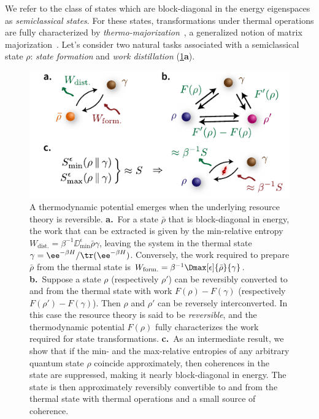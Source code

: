 \documentclass[prl,reprint,longbibliography,superscriptaddress]{revtex4-1}
\renewcommand{\Dminz}[1][]{\DD_{\mathrm{min}}^{#1}}
\begin{document}
We refer to the class of states which are block-diagonal in the energy
eigenspaces as \emph{semiclassical states}.  For these states, transformations
under thermal operations are fully characterized by
\emph{thermo-majorization}~\cite{Horodecki2013_ThermoMaj}, a generalized notion
of matrix majorization~\cite{Ruch1978JCP,BookBhatiaMatrixAnalysis1997,%
  BookMarshall2010Inequalities}.
Let's consider two natural tasks associated with a semiclassical state $\rho$:
\emph{state formation} and \emph{work distillation}
(\cref{fig:ReversibleInterConversionStates}\textbf{a}).
\begin{figure}
  \centering
  \includegraphics{fig/ReversibleInterConversionStates}
  \caption{A thermodynamic potential emerges when the underlying resource theory
    is reversible.  \textbf{a.}~For a state $\bar\rho$ that is block-diagonal in
    energy, the work that can be extracted is given by the min-relative entropy
    $W_{\mathrm{dist.}} = \beta^{-1}\Dminz[\epsilon]{\bar\rho}{\gamma}$, leaving
    the system in the thermal state $\gamma=\ee^{-\beta H}/\tr(\ee^{-\beta H})$.
    Conversely, the work required to prepare $\bar\rho$ from the thermal state
    is $W_{\mathrm{form.}} = \beta^{-1}\Dmax[\epsilon]{\bar\rho}{\gamma}$.
    \textbf{b.}~Suppose a state $\rho$ (respectively $\rho'$) can be reversibly
    converted to and from the thermal state with work $F(\rho)-F(\gamma)$
    (respectively $F(\rho')-F(\gamma)$).  Then $\rho$ and $\rho'$ can be
    reversely interconverted.  In this case the resource theory is said to be
    \emph{reversible}, and the thermodynamic potential $F(\rho)$ fully
    characterizes the work required for state transformations.  \textbf{c.}~As
    an intermediate result, we show that if the min- and the max-relative
    entropies of any arbitrary quantum state $\rho$ coincide approximately, then
    coherences in the state are suppressed, making it nearly block-diagonal in
    energy.  The state is then approximately reversibly convertible to and from
    the thermal state with thermal operations and a small source of coherence.}
  \label{fig:ReversibleInterConversionStates}
\end{figure}
\end{document}
